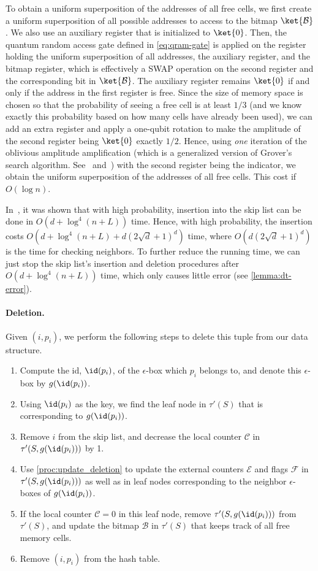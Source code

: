 To obtain a uniform superposition of the addresses of all free cells, we first create a uniform superposition of all possible addresses to access to the bitmap $\ket{\mathcal{B}}$. We also use an auxiliary register that is initialized to $\ket{0}$. Then, the quantum random access gate defined in \cref{eq:qram-gate} is applied on the register holding the uniform superposition of all addresses, the auxiliary register, and the bitmap register, which is effectively a SWAP operation on the second register and the corresponding bit in $\ket{\mathcal{B}}$. The auxiliary register remains $\ket{0}$ if and only if the address in the first register is free. Since the size of memory space is chosen so that the probability of seeing a free cell is at least $1/3$ (and we know exactly this probability based on how many cells have already been used), we can add an extra register and apply a one-qubit rotation to make the amplitude of the second register being $\ket{0}$ exactly $1/2$. Hence, using \emph{one} iteration of the oblivious amplitude amplification (which is a generalized version of Grover's search algorithm. See~\cite{r12} and~\cite{r34}) with the second register being the indicator, we obtain the uniform superposition of the addresses of all free cells. This cost if $O(\log n)$.

In~\cite{r5}, it was shown that with high probability, insertion into the skip list can be done in $O(d+\log^4(n+L))$ time. Hence, with high probability, the insertion costs $O(d+\log^4(n+L) + d(2\sqrt{d}+1)^d)$ time, where $O(d(2\sqrt{d}+1)^d)$ is the time for checking neighbors. 
To further reduce the running time, we can just stop the skip list's insertion and deletion procedures after $O(d+\log^4(n+L))$ time, which only causes little error (see \cref{lemma:dt-error}).


\paragraph{Deletion.}
Given $(i, p_i)$, we perform the following steps to delete this tuple from our data structure.
\begin{enumerate}
  \item Compute the id, $\id(p_i)$, of the $\epsilon$-box which $p_i$ belongs to, and denote this $\epsilon$-box by $g(\id(p_i))$.
  \item Using $\id(p_i)$ as the key, we find the leaf node in $\tau'(S)$ that is corresponding to $g(\id(p_i))$.
  \item Remove $i$ from the skip list, and decrease the local counter $\mathcal{C}$ in $\tau'(S, g(\id(p_i)))$ by 1.
  \item Use \cref{proc:update_deletion} to update the external counters $\mathcal{E}$ and flags $\mathcal{F}$ in $\tau'(S, g(\id(p_i)))$ as well as in leaf nodes corresponding to the neighbor $\epsilon$-boxes of $g(\id(p_i))$.
  \item If the local counter $\mathcal{C}=0$ in this leaf node, remove $\tau'(S, g(\id(p_i)))$ from $\tau'(S)$, and update the bitmap $\mathcal{B}$ in $\tau'(S)$ that keeps track of all free memory cells. 
  \item Remove $(i, p_i)$ from the hash table.
\end{enumerate}

